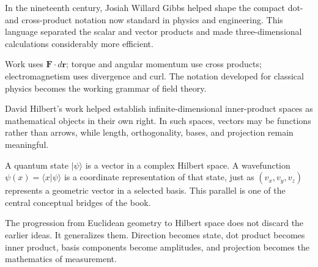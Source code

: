 \begin{chapterhistorical}
In the nineteenth century, Josiah Willard Gibbs helped shape the compact dot-
and cross-product notation now standard in physics and engineering. This
language separated the scalar and vector products and made three-dimensional
calculations considerably more efficient.
\end{chapterhistorical}
\begin{physicalbox}
Work uses $\mathbf F\cdot d\mathbf r$; torque and angular momentum use cross
products; electromagnetism uses divergence and curl. The notation developed for
classical physics becomes the working grammar of field theory.
\end{physicalbox}

\begin{chapterhistorical}
David Hilbert's work helped establish infinite-dimensional inner-product spaces
as mathematical objects in their own right. In such spaces, vectors may be
functions rather than arrows, while length, orthogonality, bases, and projection
remain meaningful.
\end{chapterhistorical}
\begin{physicalbox}
A quantum state $|\psi\rangle$ is a vector in a complex Hilbert space. A
wavefunction $\psi(x)=\langle x|\psi\rangle$ is a coordinate representation of
that state, just as $(v_x,v_y,v_z)$ represents a geometric vector in a selected
basis. This parallel is one of the central conceptual bridges of the book.
\end{physicalbox}

\begin{keyidea}
The progression from Euclidean geometry to Hilbert space does not discard the
earlier ideas. It generalizes them. Direction becomes state, dot product becomes
inner product, basis components become amplitudes, and projection becomes the
mathematics of measurement.
\end{keyidea}
